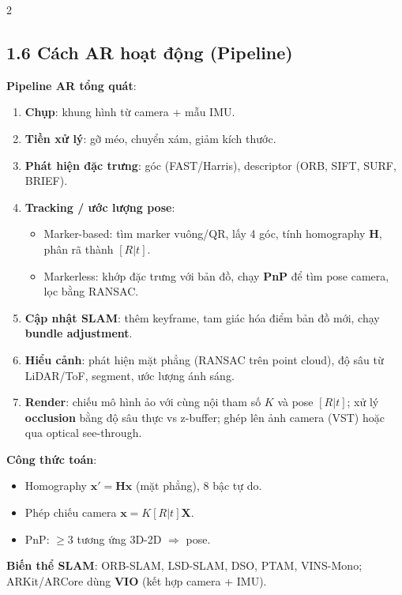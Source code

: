 \begin{paracol}{2}
\begin{center}\scriptsize
{}
\end{center}

\switchcolumn

\subsection*{1.6 Cách AR hoạt động (Pipeline)}
\textbf{Pipeline AR tổng quát}:
\begin{enumerate}[leftmargin=*,nosep]
  \item \textbf{Chụp}: khung hình từ camera + mẫu IMU.
  \item \textbf{Tiền xử lý}: gỡ méo, chuyển xám, giảm kích thước.
  \item \textbf{Phát hiện đặc trưng}: góc (FAST/Harris), descriptor (ORB, SIFT, SURF, BRIEF).
  \item \textbf{Tracking / ước lượng pose}:
    \begin{itemize}[nosep]
      \item Marker-based: tìm marker vuông/QR, lấy 4 góc, tính homography $\mathbf{H}$, phân rã thành $[R|t]$.
      \item Markerless: khớp đặc trưng với bản đồ, chạy \textbf{PnP} để tìm pose camera, lọc bằng RANSAC.
    \end{itemize}
  \item \textbf{Cập nhật SLAM}: thêm keyframe, tam giác hóa điểm bản đồ mới, chạy \textbf{bundle adjustment}.
  \item \textbf{Hiểu cảnh}: phát hiện mặt phẳng (RANSAC trên point cloud), độ sâu từ LiDAR/ToF, segment, ước lượng ánh sáng.
  \item \textbf{Render}: chiếu mô hình ảo với cùng nội tham số $K$ và pose $[R|t]$; xử lý \textbf{occlusion} bằng độ sâu thực vs z-buffer; ghép lên ảnh camera (VST) hoặc qua optical see-through.
\end{enumerate}
\textbf{Công thức toán}:
\begin{itemize}[leftmargin=*,nosep]
  \item Homography $\mathbf{x'} = \mathbf{H}\mathbf{x}$ (mặt phẳng), 8 bậc tự do.
  \item Phép chiếu camera $\mathbf{x} = K[R|t]\mathbf{X}$.
  \item PnP: $\geq 3$ tương ứng 3D-2D $\Rightarrow$ pose.
\end{itemize}
\textbf{Biến thể SLAM}: ORB-SLAM, LSD-SLAM, DSO, PTAM, VINS-Mono; ARKit/ARCore dùng \textbf{VIO} (kết hợp camera + IMU).


\end{paracol}
